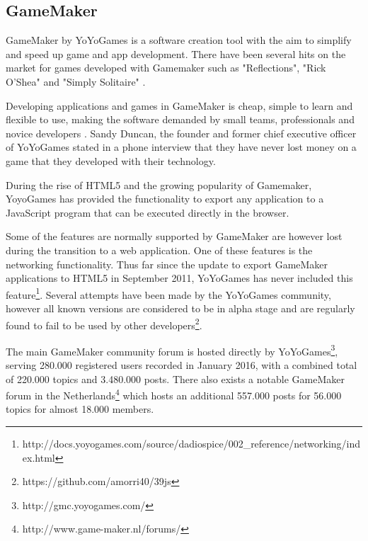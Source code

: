 \documentclass[bsc,frontabs,twoside,singlespacing,parskip,deptreport]{infthesis}     %
\begin{document}
\subsection{GameMaker}
GameMaker by YoYoGames is a software creation tool with the aim to simplify and speed up game and app development. There have been several hits on the market for games developed with Gamemaker such as "Reflections", "Rick O'Shea" and "Simply Solitaire" \cite{Gamemaker_DnD}.

Developing applications and games in GameMaker is cheap, simple to learn and flexible to use, making the software demanded by small teams, professionals and novice developers \cite{Mark_Overmars}. Sandy Duncan, the founder and former chief executive officer of YoYoGames stated in a phone interview that they have never lost money on a game that they developed with their technology\cite{Gamemaker_DnD}.

During the rise of HTML5 and the growing popularity of Gamemaker, YoyoGames has provided the functionality to export any application to a JavaScript program that can be executed directly in the browser\cite{GameMaker_Studio}.

Some of the features are normally supported by GameMaker are however lost during the transition to a web application. One of these features is the networking functionality. Thus far since the update to export GameMaker applications to HTML5 in September 2011, YoYoGames has never included this feature\footnote{http://docs.yoyogames.com/source/dadiospice/002\_reference/networking/index.html}. Several attempts have been made by the YoYoGames community, however all known versions are considered to be in alpha stage and are regularly found to fail to be used by other developers\footnote{https://github.com/amorri40/39js}. %

The main GameMaker community forum is hosted directly by YoYoGames\footnote{http://gmc.yoyogames.com/}, serving 280.000 registered users recorded in January 2016, with a combined total of 220.000 topics and 3.480.000 posts. There also exists a notable GameMaker forum in the Netherlands\footnote{http://www.game-maker.nl/forums/} which hosts an additional 557.000 posts for 56.000 topics for almost 18.000 members.
\end{document}
